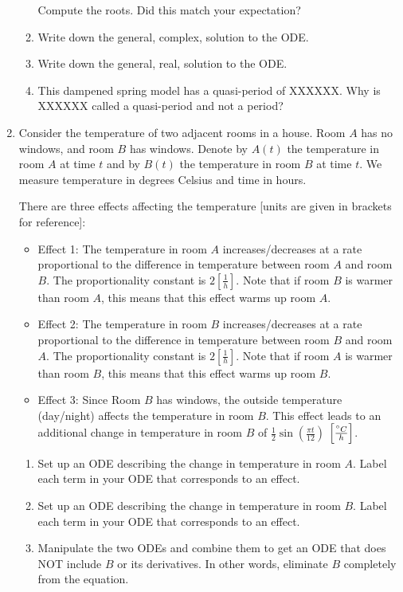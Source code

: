 \begin{enumerate}
\begin{enumerate}
        Compute the roots. Did this match your expectation?

        \item Write down the general, complex, solution to the ODE.

        \item Write down the general, real, solution to the ODE.

        \item This dampened spring model has a quasi-period of XXXXXX. Why
        is XXXXXX called a quasi-period and not a period?
    \end{enumerate}
    

    \item 
    Consider the temperature of two adjacent rooms in a house. Room $A$ has no windows, and room $B$ has windows. Denote by $A(t)$ the temperature in room $A$ at time $t$ and by $B(t)$ the temperature in room $B$ at time $t$. We measure temperature in degrees Celsius and time in hours.
    
    There are three effects affecting the temperature [units are given in brackets for reference]:
    \begin{itemize}[nosep,itemsep=2mm,topsep=2mm]
    	\item Effect 1: The temperature in room $A$ increases/decreases at a rate proportional to the difference in temperature between room $A$ and room $B$. The proportionality constant is $2\left[\frac{1}{h}\right]$. Note that if room $B$ is warmer than room $A$, this means that this effect warms up room $A$.
    	\item Effect 2: The temperature in room $B$ increases/decreases at a rate proportional to the difference in temperature between room $B$ and room $A$. The proportionality constant is $2\left[\frac{1}{h}\right]$. Note that if room $A$ is warmer than room $B$, this means that this effect warms up room $B$.
    	\item Effect 3: Since Room $B$ has windows, the outside temperature (day/night) affects the temperature in room $B$. This effect leads to an additional change in temperature in room $B$ of $\frac12\sin \left(\frac{\pi t}{12}\right)$ $\left[\frac{\degree C}{h}\right]$.
    \end{itemize}

\begin{enumerate}
	\item Set up an ODE describing the change in temperature in room $A$.
     Label each term in your ODE that corresponds to an effect.
    \item Set up an ODE describing the change in temperature in room $B$.
     Label each term in your ODE that corresponds to an effect.
    \item Manipulate the two ODEs and combine them to get an ODE that does NOT include $B$ or its derivatives. In other words, eliminate $B$ completely from the equation.


\end{enumerate}
\end{enumerate}
